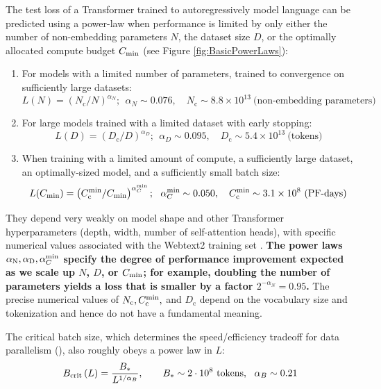 \documentclass[english]{article}
\newcommand{\be}{\begin{equation}}
\newcommand{\ee}{\end{equation}}
\begin{document}
The test loss of a Transformer trained to autoregressively model language can be predicted using a power-law  when performance is limited by only either the number of non-embedding parameters $N$, the dataset size $D$, or the optimally allocated compute budget $C_{\rm min}$ (see Figure \ref{fig:BasicPowerLaws}):
\begin{enumerate}
\setlength\itemsep{0.5em}
\item For models with a limited number of parameters, trained to convergence on sufficiently large datasets:
\be L(N) = \left(N_{\mathrm{c}}/N\right)^{\alpha_N};~~ \alpha_N \sim 0.076, \quad N_{\mathrm{c}} \sim 8.8 \times 10^{13}~\text{(non-embedding parameters)} \label{eq:crit_n} \ee
\item For large models trained with a limited dataset with early stopping:
\be L(D) = \left(D_{\mathrm{c}}/D\right)^{\alpha_D};~~ \alpha_D \sim 0.095, \quad D_{\mathrm{c}} \sim 5.4 \times 10^{13}~\text{(tokens)} \label{eq:crit_d} \ee
\item When training with a limited amount of compute, a sufficiently large dataset, an optimally-sized model, and a sufficiently small batch size:
\be L(C_{\rm min}) = \left(C_{\mathrm{c}}^{\rm min} / C_{\rm min}\right)^{\alpha_C^{\rm min}};~~ \alpha_C^{\rm min} \sim 0.050, \quad C_{\mathrm{c}}^{\rm min} \sim 3.1 \times 10^{8}~\text{(PF-days)} \label{eq:crit_c} \ee
\end{enumerate}

They depend very weakly on model shape and other Transformer hyperparameters (depth, width, number of self-attention heads), with specific numerical values associated with the Webtext2 training set \cite{radford2019language}.
\textbf{The power laws $\alpha_{\rm N}, \alpha_{\rm D}, \alpha_{C}^{\rm min}$ specify the degree of performance improvement expected as we scale up $N$, $D$, or $C_{\rm min}$; for example, doubling the number of parameters yields a loss that is smaller by a factor $2^{-\alpha_N}=0.95$.}
The precise numerical values of $N_{\mathrm{c}}, C_{\rm c}^{\rm min},$ and $D_{\mathrm{c}}$ depend on the vocabulary size and tokenization and hence do not have a fundamental meaning.  


The critical batch size, which determines the speed/efficiency tradeoff for data parallelism (\cite{1812.06162}), also roughly obeys a power law in $L$:
\begin{equation}
B_{\rm crit}\left(L\right)=\frac{B_{\ast}}{L^{1/\alpha_{B}}},\qquad B_{\ast} \sim 2\cdot 10^8 \text{ tokens},\ \ \alpha_{B} \sim 0.21
\label{eq:critical-batch-size}
\end{equation}
\end{document}
